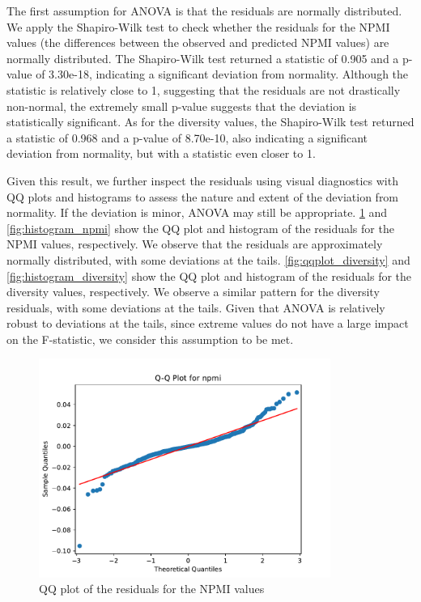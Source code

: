 The first assumption for ANOVA is that the residuals are normally distributed. We apply the Shapiro-Wilk test to check whether the residuals for the NPMI values (the differences between the observed and predicted NPMI values) are normally distributed. The Shapiro-Wilk test returned a statistic of 0.905 and a p-value of 3.30e-18, indicating a significant deviation from normality. Although the statistic is relatively close to 1, suggesting that the residuals are not drastically non-normal, the extremely small p-value suggests that the deviation is statistically significant. As for the diversity values, the Shapiro-Wilk test returned a statistic of 0.968 and a p-value of 8.70e-10, also indicating a significant deviation from normality, but with a statistic even closer to 1.

Given this result, we further inspect the residuals using visual diagnostics with Q\-Q plots and histograms to assess the nature and extent of the deviation from normality. If the deviation is minor, ANOVA may still be appropriate. \cref{fig:qqplot_npmi} and \cref{fig:histogram_npmi} show the Q\-Q plot and histogram of the residuals for the NPMI values, respectively. We observe that the residuals are approximately normally distributed, with some deviations at the tails. \cref{fig:qqplot_diversity} and \cref{fig:histogram_diversity} show the Q\-Q plot and histogram of the residuals for the diversity values, respectively. We observe a similar pattern for the diversity residuals, with some deviations at the tails. Given that ANOVA is relatively robust to deviations at the tails, since extreme values do not have a large impact on the F-statistic, we consider this assumption to be met.

\begin{figure}[h]
    \centering
    \includegraphics[width=0.85\textwidth]{figures/qqplot_npmi.pdf}
    \caption{Q\-Q plot of the residuals for the NPMI values}
    \label{fig:qqplot_npmi}
\end{figure}

